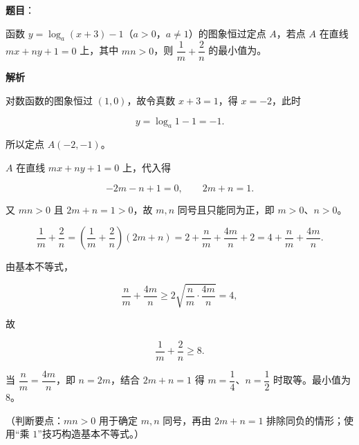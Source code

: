 \begin{answer}

\textbf{题目}：

函数 $y=\log_a(x+3)-1$（$a>0$，$a\neq1$）的图象恒过定点 $A$，若点 $A$ 在直线 $mx+ny+1=0$ 上，其中 $mn>0$，则 $\dfrac1m+\dfrac2n$ 的最小值为\gkblank{}。

\textbf{解析}

对数函数的图象恒过 $(1,0)$，故令真数 $x+3=1$，得 $x=-2$，此时

\nopagebreak[4]
\[y=\log_a1-1=-1.\]

所以定点 $A(-2,-1)$。

$A$ 在直线 $mx+ny+1=0$ 上，代入得

\nopagebreak[4]
\[-2m-n+1=0,\qquad 2m+n=1.\]

又 $mn>0$ 且 $2m+n=1>0$，故 $m,n$ 同号且只能同为正，即 $m>0$、$n>0$。

\nopagebreak[4]
\[{\frac1m+\frac2n}=\left(\frac1m+\frac2n\right)(2m+n)=2+\frac nm+\frac{4m}{n}+2=4+\frac nm+\frac{4m}{n}.\]

由基本不等式，

\nopagebreak[4]
\[\frac nm+\frac{4m}{n}\geqslant2\sqrt{\frac nm\cdot\frac{4m}{n}}=4,\]

故

\nopagebreak[4]
\[\frac1m+\frac2n\geqslant8.\]

当 $\dfrac nm=\dfrac{4m}{n}$，即 $n=2m$，结合 $2m+n=1$ 得 $m=\dfrac14$、$n=\dfrac12$ 时取等。最小值为 $8$。

（判断要点：$mn>0$ 用于确定 $m,n$ 同号，再由 $2m+n=1$ 排除同负的情形；使用“乘 $1$”技巧构造基本不等式。）


\end{answer}
